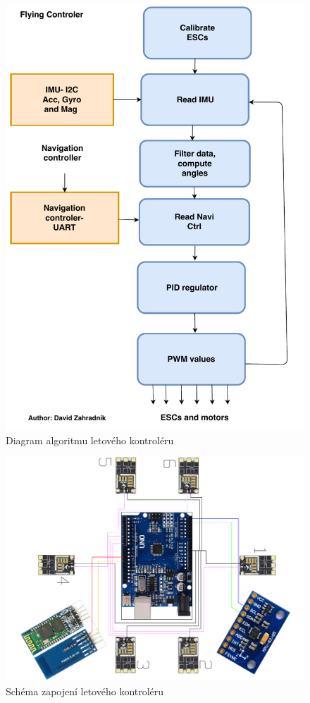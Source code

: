 \begin{figure}[H]
	\centering
	\includegraphics[width=12cm]{pictures/FlyingDiagram.pdf}
	\caption{Diagram algoritmu letového kontroléru}
\end{figure}


\begin{figure}[H]
	\centering
	\includegraphics[width=12cm,angle=90]{pictures/flyctrl.pdf}
	\caption{Schéma zapojení letového kontroléru}
\end{figure}

